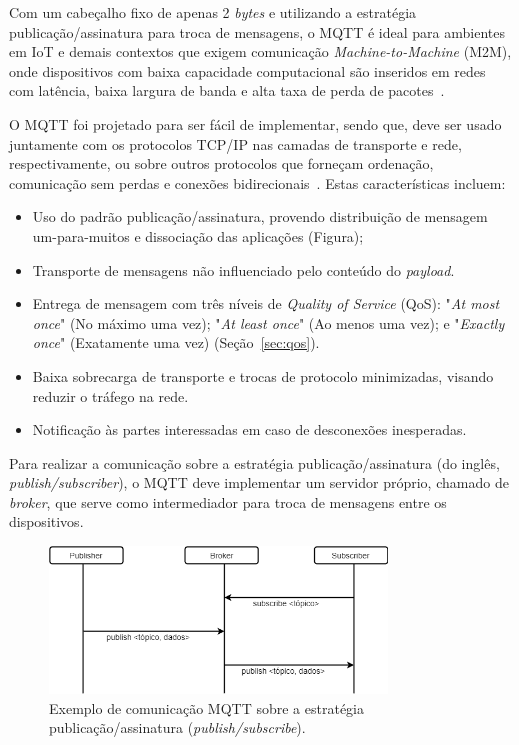 Com um cabeçalho fixo de apenas 2 \textit{bytes} e utilizando a estratégia publicação/assinatura para troca de mensagens, o MQTT é ideal para ambientes em IoT e demais contextos que exigem comunicação \textit{Machine-to-Machine} (M2M), onde  dispositivos com baixa capacidade computacional são inseridos em redes com latência, baixa largura de banda e alta taxa de perda de pacotes~\cite{mqttv3.1.1}.

O MQTT foi projetado para ser fácil de implementar, sendo que, deve ser usado juntamente com os protocolos TCP/IP nas camadas de transporte e rede, respectivamente, ou sobre outros protocolos que forneçam ordenação, comunicação sem perdas e conexões bidirecionais~\cite{mqttv3.1.1}. Estas características incluem:

\begin{itemize}
	\item Uso do padrão publicação/assinatura, provendo distribuição de mensagem um-para-muitos e dissociação das aplicações (Figura);
	\item Transporte de mensagens não influenciado pelo conteúdo do \textit{payload}.
	\item Entrega de mensagem com três níveis de \textit{Quality of Service} (QoS): "\textit{At most once}" (No máximo uma vez); "\textit{At least once}" (Ao menos uma vez); e "\textit{Exactly once}" (Exatamente uma vez) (Seção~\ref{sec:qos}).
	\item  Baixa sobrecarga de transporte e trocas de protocolo minimizadas, visando reduzir o tráfego na rede.
	\item Notificação às partes interessadas em caso de desconexões inesperadas.
\end{itemize} 

Para realizar a comunicação sobre a estratégia publicação/assinatura (do inglês, \textit{publish/subscriber}), o MQTT deve implementar um servidor próprio, chamado de \textit{broker}, que serve como intermediador para troca de mensagens entre os dispositivos.

\begin{figure}[ht]
	\centering
	\includegraphics[width=0.8\textwidth]{imagens/mqtt_broker.png}
	\caption{Exemplo de comunicação MQTT sobre a estratégia publicação/assinatura (\textit{publish/subscribe}).
		\label{fig:mqtt_broker}}
\end{figure}
\FloatBarrier

